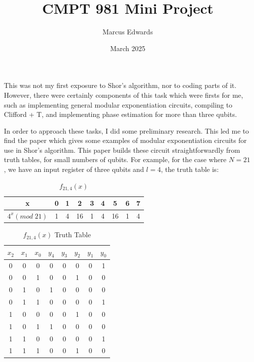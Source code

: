 \documentclass{article}
\title{CMPT 981 Mini Project}
\author{Marcus Edwards}
\date{March 2025}
\begin{document}
\maketitle

This was not my first exposure to Shor's algorithm, nor to coding parts of it. However, there were certainly components of this task which were firsts for me, such as implementing general modular exponentiation circuits, compiling to Clifford + T, and implementing phase estimation for more than three qubits.

In order to approach these tasks, I did some preliminary research. This led me to find the paper \cite{gamel2013simplifiedfactoringalgorithmsvalidating} which gives some examples of modular exponentiation circuits for use in Shor's algorithm. This paper builds these circuit straightforwardly from truth tables, for small numbers of qubits. For example, for the case where $N=21$, we have an input register of three qubits and $l=4$, the truth table is:

\begin{table}[h]
    \centering
    \begin{tabular}{|c  c  c  c  c  c  c  c  c|}
        \hline
        x & 0 & 1 & 2 & 3 & 4 & 5 & 6 & 7 \\
        \hline
        $4^x (mod \; 21)$ & 1 & 4 & 16 & 1 & 4 & 16 & 1 & 4 \\
        \hline
    \end{tabular}
    \caption{$f_{21,4}(x)$}
    \label{tab:my_label}
\end{table}

\vspace{5mm}

\begin{table}[h]
    \centering
    \begin{tabular}{|c  c  c  c  c  c  c  c|}
        \hline
        $x_2$ & $x_1$ & $x_0$ & $y_4$ & $y_3$ & $y_2$ & $y_1$ & $y_0$ \\
        \hline
        0 & 0 & 0 & 0 & 0 & 0 & 0 & 1 \\
        \hline
        0 & 0 & 1 & 0 & 0 & 1 & 0 & 0 \\
        \hline
        0 & 1 & 0 & 1 & 0 & 0 & 0 & 0 \\
        \hline
        0 & 1 & 1 & 0 & 0 & 0 & 0 & 1 \\
        \hline
        1 & 0 & 0 & 0 & 0 & 1 & 0 & 0 \\
        \hline
        1 & 0 & 1 & 1 & 0 & 0 & 0 & 0 \\
        \hline
        1 & 1 & 0 & 0 & 0 & 0 & 0 & 1 \\
        \hline
        1 & 1 & 1 & 0 & 0 & 1 & 0 & 0 \\
        \hline
    \end{tabular}
    \caption{$f_{21,4}(x)$ Truth Table}
    \label{tab:my_label}
\end{table}
\end{document}
